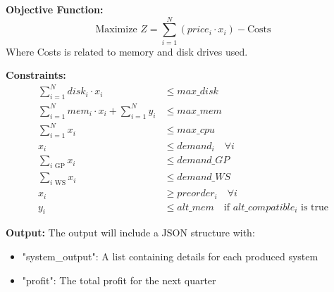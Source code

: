 \documentclass{article}
\begin{document}
\textbf{Objective Function:}
\begin{equation}
\text{Maximize } Z = \sum_{i=1}^{N} (price_i \cdot x_i) - \text{Costs}
\end{equation}
Where Costs is related to memory and disk drives used.

\textbf{Constraints:}
\begin{align}
\sum_{i=1}^{N} disk_i \cdot x_i & \leq max\_disk \tag{Disk Drive Supply} \\
\sum_{i=1}^{N} mem_i \cdot x_i + \sum_{i=1}^{N} y_i & \leq max\_mem \tag{Memory Supply} \\
\sum_{i=1}^{N} x_i & \leq max\_cpu \tag{CPU Supply} \\
x_i & \leq demand_i \quad \forall i \tag{Demand for each system} \\
\sum_{i \text{ GP}} x_i & \leq demand\_GP \tag{Demand for GP family} \\
\sum_{i \text{ WS}} x_i & \leq demand\_WS \tag{Demand for WS family} \\
x_i & \geq preorder_i \quad \forall i \tag{Preorders must be fulfilled} \\
y_i & \leq alt\_mem \quad \text{if } alt\_compatible_i \text{ is true} \tag{Alternative Memory Constraints}
\end{align}

\textbf{Output:}
The output will include a JSON structure with:
\begin{itemize}
    \item "system\_output": A list containing details for each produced system
    \item "profit": The total profit for the next quarter
\end{itemize}
\end{document}
